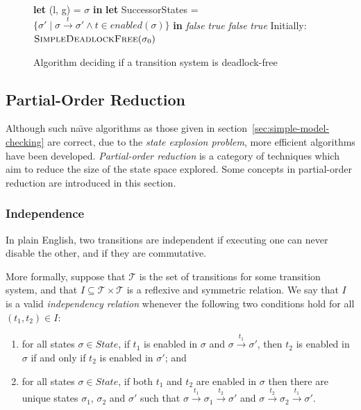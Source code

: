 \documentclass[12pt,a4paper,twoside,openright]{report}
\newcommand{\Let}[2]{\State \textbf{let} #1 = #2 \textbf{in}}
\begin{document}
\begin{figure}
	\begin{algorithmic}[1]
		\Let{(l, g)}{$\sigma$}
		\Let{SuccessorStates}{$\{\sigma' \mid \sigma \xrightarrow{t}
			\sigma' \wedge t \in \textit{enabled}(\sigma)\}$}
				 \Return \textit{false}
				\EndIf
			\EndFor
			\State \Return \textit{true}
		\Else
					\Return \textit{false}
				\EndIf
			\EndFor
		\State \Return \textit{true}
		\EndIf
		\EndProcedure
		\State
		\State Initially: $\textsc{SimpleDeadlockFree}(\sigma_0)$
	\end{algorithmic}
	\caption{Algorithm deciding if a transition system is deadlock-free}
	\label{fig:simple-deadlock-free}
\end{figure}

\subsection{Partial-Order Reduction}
Although such na\"{\i}ve algorithms as those given
in section~\ref{sec:simple-model-checking}
are correct, due to the \emph{state explosion problem},
more efficient algorithms have been developed.
\emph{Partial-order reduction} is a category of
techniques which aim to reduce the size of the
state space explored. Some concepts in
partial-order reduction are introduced in
this section.

\subsubsection{Independence} \label{sec:independence}
In plain English, two transitions are independent if executing one
can never disable the other, and if they are commutative.

More formally, suppose that $\mathcal{T}$ is the set of
transitions for some transition system, and
that $I \subseteq \mathcal{T} \times \mathcal{T}$
is a reflexive and symmetric relation. We say
that $I$ is a valid \emph{independency relation}
whenever the following two conditions hold for
all $(t_1, t_2) \in I$:
\begin{enumerate}
	\item for all states $\sigma \in \textit{State}$,
		if $t_1$ is enabled in $\sigma$ and
		$\sigma \xrightarrow{t_1} \sigma'$, then
		$t_2$ is enabled in $\sigma$ if and only if
		$t_2$ is enabled in $\sigma'$; and
	\item for all states $\sigma \in \textit{State}$,
		if both $t_1$ and $t_2$ are enabled in $\sigma$
		then there are unique states $\sigma_1$, $\sigma_2$ and
		$\sigma'$ such that
		$\sigma \xrightarrow{t_1} \sigma_1 \xrightarrow{t_2} \sigma'$
		and
		$\sigma \xrightarrow{t_2} \sigma_2 \xrightarrow{t_1} \sigma'$.
\end{enumerate}
\end{document}
